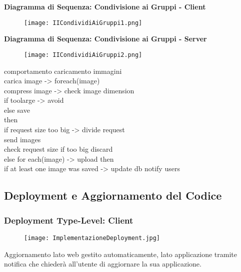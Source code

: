 \textbf{Diagramma di Sequenza: Condivisione ai Gruppi - Client}\\
\begin{figure}[h!]
    \begin{center}
        \texttt{[image: IICondividiAiGruppi1.png]}
    \end{center}
\end{figure}

\textbf{Diagramma di Sequenza: Condivisione ai Gruppi - Server}\\
\begin{figure}[h!]
    \begin{center}
        \texttt{[image: IICondividiAiGruppi2.png]}
    \end{center}
\end{figure}
\clearpage
comportamento caricamento immagini\\
carica image -> 
foreach(image)\\
compress image -> check image dimension\\
if toolarge -> avoid \\
else save\\
then\\
if request size too big -> divide request\\

send images\\
check request size if too big discard\\
else for each(image) -> upload 
then\\
if at least one image was saved -> update db notify users\\








\clearpage
\subsection{Deployment e Aggiornamento del Codice}

\subsubsection{Deployment Type-Level: Client}

\begin{figure}[h!]
    \begin{center}
        \texttt{[image: ImplementazioneDeployment.jpg]}
    \end{center}
\end{figure}
Aggiornamento lato web gestito automaticamente, lato applicazione tramite notifica che chiederà all'utente di aggiornare la sua applicazione.\\
\clearpage
